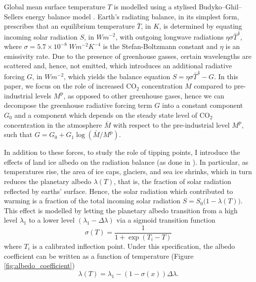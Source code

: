 \documentclass[../../main.tex]{subfiles}
\begin{document}
Global mean surface temperature $T$ is modelled using a stylised Budyko–Ghil–Sellers energy balance model \citep{hogg_glacial_2008, ashwin_extreme_2020}. Earth's radiating balance, in its simplest form, prescribes that an equilibrium temperature $\bar{T}$, in $\unit{K}$, is determined by equating incoming solar radiation $S$, in $\unit{W}\unit{m}^{-2}$, with outgoing longwave radiations $\eta \sigma \bar{T}^4$, where $\sigma = 5.7 \times 10^{-8} \; \unit{W} \unit{m}^{-2} \unit{K}^{-4}$ is the Stefan-Boltzmann constant and $\eta$ is an emissivity rate. Due to the presence of greenhouse gasses, certain wavelengths are scattered and, hence, not emitted, which introduces an additional radiative forcing $G$, in $\unit{W}\unit{m}^{-2}$, which yields the balance equation $S = \eta \sigma \bar{T}^4 - G$. In this paper, we focus on the role of increased CO$_2$ concentration $M$ compared to pre-industrial levels $M^{\mathrm{p}}$, as opposed to other greenhouse gases, hence we can decompose the greenhouse radiative forcing term $G$ into a constant component $G_0$ and a component which depends on the steady state level of CO$_2$ concentration in the atmosphere $\bar{M}$ with respect to the pre-industrial level $M^{\mathrm{p}}$, such that $G = G_0 + G_1 \log(\bar{M} / M^{\mathrm{p}})$.

In addition to these forces, to study the role of tipping points, I introduce the effects of land ice albedo on the radiation balance (as done in \cite{ghil_topics_2012,dijkstra_sensitivity_2015}). In particular, as temperatures rise, the area of ice caps, glaciers, and sea ice shrinks, which in turn reduces the planetary albedo $\lambda(T)$, that is, the fraction of solar radiation reflected by earths' surface. Hence, the solar radiation which contributed to warming is a fraction of the total incoming solar radiation $S = S_0 \big(1 - \lambda(T)\big)$. This effect is modelled by letting the planetary albedo transition from a high level $\lambda_1$ to a lower level $(\lambda_1 - \Delta \lambda)$ via a sigmoid transition function \begin{equation}
    \sigma(T) = \frac{1}{1 + \exp(T_i - T)}
\end{equation} where $T_i$ is a calibrated inflection point. Under this specification, the albedo coefficient can be written as a function of temperature (Figure \ref{fig:albedo_coefficient}) \begin{equation} \label{eq:assumption:albedo}
    \lambda(T) = \lambda_1 - (1 - \sigma(x)) \Delta \lambda.
\end{equation} 
\end{document}
